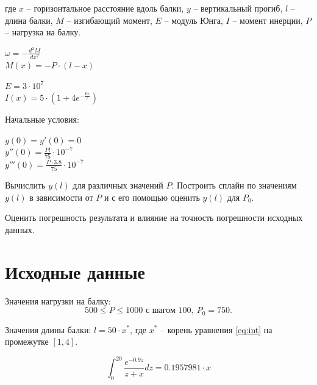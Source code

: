 где $x$ -- горизонтальное расстояние вдоль балки, $y$ -- вертикальный прогиб, $l$ -- длина балки, $M$ -- изгибающий момент, $E$ -- модуль Юнга, $I$ -- момент инерции, $P$ -- нагрузка на балку.

\begin{center}
\begin{multicols}{2}
$\omega = - \frac{d^2M}{dx^2}$\\
$M(x) = -P \cdot (l - x)$
\end{multicols}
\end{center}

\begin{center}
\begin{multicols}{2}
$E = 3\cdot 10^7$\\
$I(x) = 5 \cdot (1 + 4 e^{-\frac{6x}{l}})$
\end{multicols}
\end{center}

Начальные условия:
\begin{center}
\begin{multicols}{3}
$y(0) = y'(0) = 0$\\
$y''(0) = \frac{Pl}{75}\cdot 10^{-7}$\\
$y'''(0) = \frac{P \cdot 3.8}{75}\cdot 10^{-7}$
\end{multicols}
\end{center}

Вычислить $y(l)$ для различных значений $P$. Построить сплайн по значениям $y(l)$ в зависимости от $P$ и с его помощью оценить $y(l)$ для $P_0$. 

Оценить погрешность результата и влияние на точность погрешности исходных данных.

\section{Исходные данные}

Значения нагрузки на балку: 
\begin{equation}\label{eq:p_values}
	500 \le P \le 1000 \text{ с шагом } 100,\ P_0 = 750.
\end{equation}

Значения длины балки: $l = 50\cdot x^*$, где $x^*$ -- корень уравнения \ref{eq:int} на промежутке $[1, 4]$.

\begin{equation}\label{eq:int}
	\int_0^{20} \frac{e^{-0.9z}}{z+x}dz = 0.1957981\cdot x
\end{equation}

